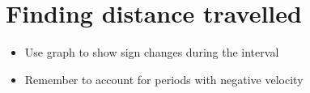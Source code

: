 \section{Finding distance travelled}
\begin{itemize}
    \item Use graph to show sign changes during the interval
    \item Remember to account for periods with negative velocity
\end{itemize}